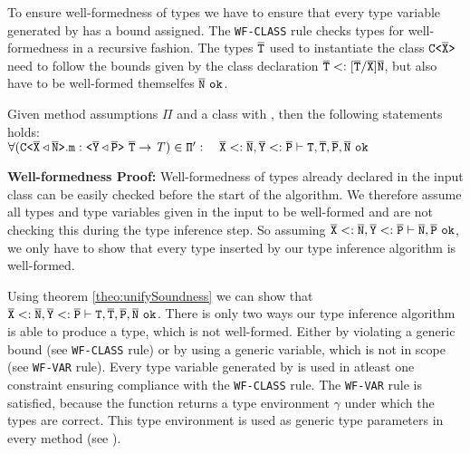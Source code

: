 To ensure well-formedness of types we have to ensure that every type variable generated by \fjtype{} has a bound assigned.
The \texttt{WF-CLASS} rule checks types for well-formedness in a recursive fashion.
The types $\overline{\tt T}$ used to instantiate the class $\mathtt{C \texttt{<} \overline{\tt X} \texttt{>} }$ need to follow the bounds given by the class declaration $\overline{\tt T} <: [\overline{\tt T}/\overline{\tt X}]\overline{\tt N}$, but also have to be well-formed themselfes $\overline{\tt N}\ \texttt{ok}$.
\begin{lemma}\label{lemma:well-formedness}
  Given method assumptions $\Pi$ and a class  with
  ,
  then the following statements holds:\\
  \normalfont $\forall (\exptype{C}{\ol{X} \triangleleft \ol{N}}.\texttt{m} : \exptype{}{\ol{Y} \triangleleft \ol{P}}\ \ol{\type{T}} \to \itype{T}) \in \mv{\Pi}': \quad \ol{X} <: \ol{N}, \ol{Y} <: \ol{P} \vdash \type{T}, \ol{T}, \ol{P}, \ol{N}\ \texttt{ok}$
\end{lemma}
\textbf{Well-formedness Proof:}
Well-formedness of types already declared in the input class can be easily checked before the start of the \fjtype{} algorithm.
We therefore assume all types and type variables given in the input to be well-formed and are not checking this during the type inference step.
So assuming $\ol{X} <: \ol{N}, \ol{Y} <: \ol{P} \vdash \ol{N}, \ol{P}\ \texttt{ok}$, we only have to show that every type inserted by our type inference algorithm is well-formed.

Using theorem \ref{theo:unifySoundness} we can show that $\overline{\tt X} <: \overline{\tt N}, \overline{\tt Y} <: \overline{\tt P} \vdash \texttt{T}, \overline{\tt T}, \overline{\tt P}, \overline{\tt N}\ \texttt{ok}$.
There is only two ways our type inference algorithm is able to produce a type, which is not well-formed.
Either by violating a generic bound (see \texttt{WF-CLASS} rule)
or by using a generic variable, which is not in scope (see \texttt{WF-VAR} rule).
Every type variable generated by \fjtype{} is used in atleast one constraint ensuring compliance with the \texttt{WF-CLASS} rule.
The \texttt{WF-VAR} rule is satisfied, because the \unify{} function returns a type environment $\gamma$ under which the types are correct.
This type environment is used as generic type parameters in every method (see \fjtypeinference{}). 

